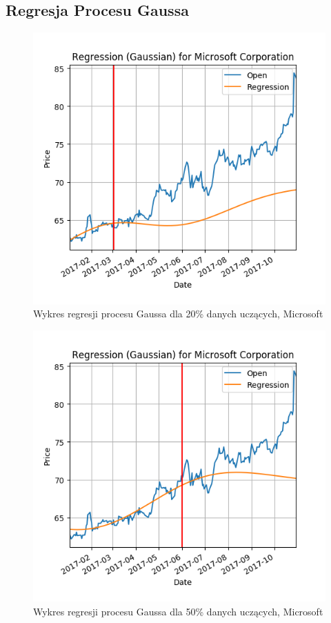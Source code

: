 \subsection{Regresja Procesu Gaussa}

\begin{figure}[h!]
\centering
\includegraphics[width=150mm]{pictures/plots/microsoft_gpr_20.png}
\caption{Wykres regresji procesu Gaussa dla 20\% danych uczących, Microsoft}
\label{fig:Wykres regresji procesu Gaussa nośnych dla 20\% danych uczących, Microsoft}
\end{figure}

\begin{figure}[h!]
\centering
\includegraphics[width=150mm]{pictures/plots/microsoft_gpr_50.png}
\caption{Wykres regresji procesu Gaussa dla 50\% danych uczących, Microsoft}
\label{fig:Wykres regresji procesu Gaussa nośnych dla 50\% danych uczących, Microsoft}
\end{figure}

